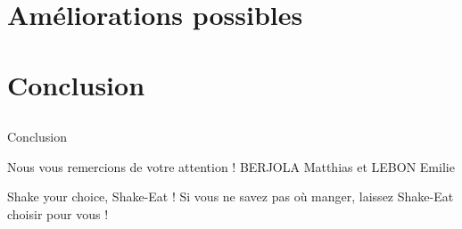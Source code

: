 \section{Améliorations possibles}

\section{Conclusion}

    \subsection{}
    \frame{\sectionpage}

    
    
    \begin{frame}{Conclusion}
        \begin{block}{\centering Nous vous remercions de votre attention !}
             \centering \alert{ BERJOLA Matthias et LEBON Emilie}
        \end{block}
    \end{frame}
    
    
    \begin{frame}{Shake your choice, Shake-Eat !}
        \centering
        Si vous ne savez pas où manger, laissez Shake-Eat choisir pour vous !
    \end{frame}